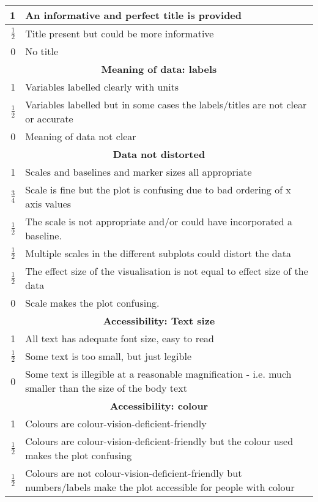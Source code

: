 \documentclass{article}
\begin{document}
\begin{tabular}{@{}|r|p{6.5in}|@{}}
  \hline
  1 & An informative and perfect title is provided \\
  \hline
  $\frac{1}{2}$ & Title present but could be more informative \\
  \hline
  0 & No title
  \\
  \hline
  \multicolumn{2}{c}{\textbf{Meaning of data: labels}}\\
  \hline
  1 
  &Variables labelled clearly with units
  \\
  \hline $\frac{1}{2}$ 
  &Variables labelled  but in some cases the labels/titles are not clear or accurate
  \\
  \hline
  0 
  &Meaning of data not clear
  \\
  \hline
  \multicolumn{2}{c}{\textbf{Data not distorted}}
  \\
  \hline
  1 
  & Scales and baselines and marker sizes all appropriate
  \\
  \hline $\frac{3}{4}$ 
  &Scale is fine but the plot is confusing due to bad ordering of x axis values
  \\
  \hline $\frac{1}{2}$ 
  & The scale is not appropriate and/or could have incorporated a baseline.
  \\
  \hline $\frac{1}{2}$ 
  &Multiple scales in the different subplots could distort the data
  \\
  \hline $\frac{1}{2}$ 
  &The effect size of the visualisation is not equal to effect size of the data
  \\
  \hline 0 
  &Scale makes the plot confusing.
  \\
  \hline
  \multicolumn{2}{c}{\textbf{Accessibility: Text size}}
  \\
  \hline
  1 
  &All text has adequate font size, easy to read
  \\
  \hline $\frac{1}{2}$ 
  &Some text is too small, but just legible
  \\
  \hline0 
  &Some text is illegible at a reasonable magnification - i.e. much smaller than the size of the body text
  \\
  \hline
  \multicolumn{2}{c}{\textbf{Accessibility: colour}}
  \\
  \hline
  1 
  & Colours are colour-vision-deficient-friendly
  \\
  \hline $\frac{1}{2}$ 
  & Colours are colour-vision-deficient-friendly but the colour used makes the plot confusing
  \\
  \hline $\frac{1}{2}$ 
  & Colours are not colour-vision-deficient-friendly but
  numbers/labels make the plot accessible for people with colour

\end{tabular}
\end{document}
